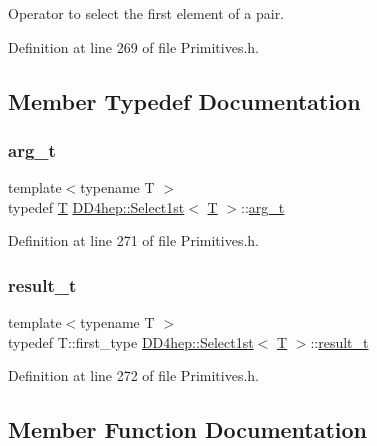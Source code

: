 Operator to select the first element of a pair. 

Definition at line 269 of file Primitives.\+h.



\subsection{Member Typedef Documentation}
\hypertarget{class_d_d4hep_1_1_select1st_a271f38874bb7bcaf5867dc6d4ad356d1}{}\label{class_d_d4hep_1_1_select1st_a271f38874bb7bcaf5867dc6d4ad356d1} 
\subsubsection{\texorpdfstring{arg\+\_\+t}{arg\_t}}
{\footnotesize\ttfamily template$<$typename T $>$ \\
typedef \hyperlink{class_t}{T} \hyperlink{class_d_d4hep_1_1_select1st}{D\+D4hep\+::\+Select1st}$<$ \hyperlink{class_t}{T} $>$\+::\hyperlink{class_d_d4hep_1_1_select1st_a271f38874bb7bcaf5867dc6d4ad356d1}{arg\+\_\+t}}



Definition at line 271 of file Primitives.\+h.

\hypertarget{class_d_d4hep_1_1_select1st_a39139f045fd65227afbed9a441a5eaea}{}\label{class_d_d4hep_1_1_select1st_a39139f045fd65227afbed9a441a5eaea} 
\subsubsection{\texorpdfstring{result\+\_\+t}{result\_t}}
{\footnotesize\ttfamily template$<$typename T $>$ \\
typedef T\+::first\+\_\+type \hyperlink{class_d_d4hep_1_1_select1st}{D\+D4hep\+::\+Select1st}$<$ \hyperlink{class_t}{T} $>$\+::\hyperlink{class_d_d4hep_1_1_select1st_a39139f045fd65227afbed9a441a5eaea}{result\+\_\+t}}



Definition at line 272 of file Primitives.\+h.



\subsection{Member Function Documentation}
\hypertarget{class_d_d4hep_1_1_select1st_aa58aba96bc16bc52769db6b701e6998c}{}\label{class_d_d4hep_1_1_select1st_aa58aba96bc16bc52769db6b701e6998c} 
